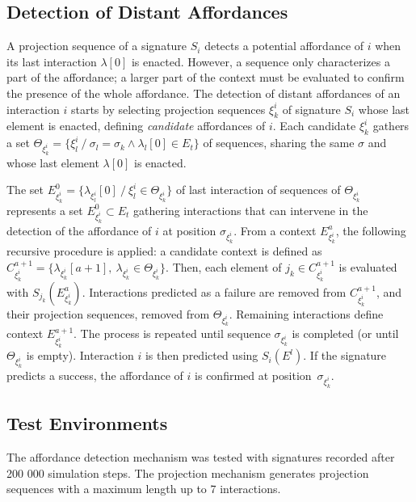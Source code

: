 \documentclass[conference]{IEEEtran}
\begin{document}
\subsection{Detection of Distant Affordances}\label{detection}


A projection sequence of a signature $S_i$ detects a potential affordance of $i$ when its last interaction $\lambda[0]$ is enacted.
However, a sequence only characterizes a part of the affordance; a larger part of the context must be evaluated to confirm the presence of the whole affordance.
The detection of distant affordances of an interaction $i$ starts by selecting projection sequences $\xi_k^i$ of signature $S_i$ whose last element is enacted, defining \textit{candidate} affordances of $i$. Each candidate $\xi_k^i$ gathers a set $\Theta_{\xi_k^i} = \{\xi_l^i ~/~ \sigma_l = \sigma_k \wedge \lambda_l[0] \in E_t\}$ of sequences, sharing the same $\sigma$ and whose last element $\lambda[0]$ is enacted.

The set $E_{\xi_k^i}^0=\{\lambda_{\xi_l^i}[0] ~/~\xi_l^i \in \Theta_{\xi_k^i}\}$ of last interaction of sequences of $\Theta_{\xi_k^i}$ represents a set $E_{\xi_k^i}^0 \subset E_t$ gathering interactions that can intervene in the detection of the affordance of $i$ at position $\sigma_{\xi_k^i}$.
From a context $E_{\xi_k^i}^a$, the following recursive procedure is applied: a candidate context is defined as $C_{\xi_k^i}^{a+1} = \{\lambda_{\xi_k^i}[a+1] ,~ \lambda_{\xi_k^i} \in \Theta_{\xi_k^i} \} $. Then, each element of $j_k \in C_{\xi_k^i}^{a+1}$ is evaluated with $S_{j_k}(E_{\xi_k^i}^a)$. Interactions predicted as a failure are removed from $C_{\xi_k^i}^{a+1}$, and their projection sequences, removed from $\Theta_{\xi_k^i}$. Remaining interactions define context $E_{\xi_k^i}^{a+1}$. The process is repeated until sequence $\sigma_{\xi_k^i}$ is completed (or until $\Theta_{\xi_k^i}$ is empty). Interaction $i$ is then predicted using $S_i(E^l)$. If the signature predicts a success, the affordance of $i$ is confirmed at position~$\sigma_{\xi_k^i}$.


\subsection{Test Environments}\label{test}

The affordance detection mechanism was tested with signatures recorded after 200 000 simulation steps.
The projection mechanism generates projection sequences with a maximum length up to 7 interactions.
\end{document}
